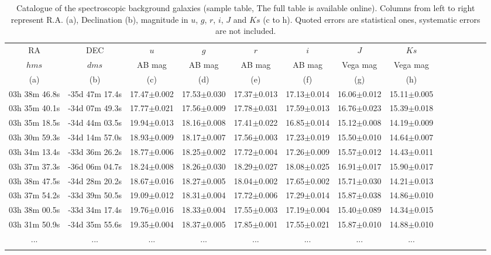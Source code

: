 \documentclass[fleqn,usenatbib]{mnras}
\begin{document}
\begin{table*}
\caption{Catalogue of the spectroscopic background galaxies (sample table, The full table is available online). Columns from left to right represent R.A. (a), Declination (b), magnitude in $u$, $g$, $r$, $i$, $J$ and $Ks$ (c to h). Quoted errors are statistical ones, systematic errors are not included.}
\begin{tabular}{ cccccccccccccc } \hline  
RA & DEC & $u$ & $g$ & $r$ & $i$ & $J$ & $Ks$ \\
$hms$ & $dms$ & AB mag & AB mag & AB mag & AB mag & Vega mag & Vega mag \\
(a) & (b) &  (c) &  (d) &  (e) &  (f) &  (g)  &  (h)\\
\hline
03h 38m 46.8s & -35d 47m 17.4s & 17.47$\pm$0.002 & 17.53$\pm$0.030 & 17.37$\pm$0.013 & 17.13$\pm$0.014 & 16.06$\pm$0.012 & 15.11$\pm$0.005  \\
03h 35m 40.1s & -34d 07m 49.3s & 17.77$\pm$0.021 & 17.56$\pm$0.009 & 17.78$\pm$0.031 & 17.59$\pm$0.013 & 16.76$\pm$0.023 & 15.39$\pm$0.018  \\
03h 35m 18.5s & -34d 44m 03.5s & 19.94$\pm$0.013 & 18.16$\pm$0.008 & 17.41$\pm$0.022 & 16.85$\pm$0.014 & 15.12$\pm$0.008 & 14.19$\pm$0.009  \\
03h 30m 59.3s & -34d 14m 57.0s & 18.93$\pm$0.009 & 18.17$\pm$0.007 & 17.56$\pm$0.003 & 17.23$\pm$0.019 & 15.50$\pm$0.010 & 14.64$\pm$0.007  \\
03h 34m 13.4s & -33d 36m 26.2s & 18.77$\pm$0.006 & 18.25$\pm$0.002 & 17.72$\pm$0.004 & 17.26$\pm$0.009 & 15.57$\pm$0.012 & 14.43$\pm$0.011  \\
03h 37m 37.3s & -36d 06m 04.7s & 18.24$\pm$0.008 & 18.26$\pm$0.030 & 18.29$\pm$0.027 & 18.08$\pm$0.025 & 16.91$\pm$0.017 & 15.90$\pm$0.017  \\
03h 38m 47.5s & -34d 28m 20.2s & 18.67$\pm$0.016 & 18.27$\pm$0.005 & 18.04$\pm$0.002 & 17.65$\pm$0.002 & 15.71$\pm$0.030 & 14.21$\pm$0.013  \\
03h 37m 54.2s & -33d 39m 50.5s & 19.09$\pm$0.012 & 18.31$\pm$0.004 & 17.72$\pm$0.006 & 17.29$\pm$0.014 & 15.87$\pm$0.038 & 14.86$\pm$0.010  \\
03h 38m 00.5s & -33d 34m 17.4s & 19.76$\pm$0.016 & 18.33$\pm$0.004 & 17.55$\pm$0.003 & 17.19$\pm$0.004 & 15.40$\pm$0.089 & 14.34$\pm$0.015  \\
03h 31m 50.9s & -34d 35m 55.6s & 19.35$\pm$0.004 & 18.37$\pm$0.005 & 17.85$\pm$0.001 & 17.55$\pm$0.021 & 15.87$\pm$0.010 & 14.88$\pm$0.010  \\

... & ... & ... & ... & ... & ... & ... & ... \\
\hline
\label{back}
\end{tabular}
\end{table*}
\end{document}
